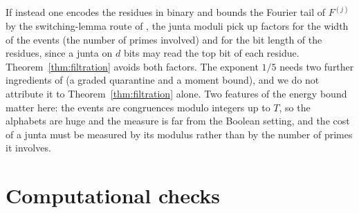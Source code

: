 \documentclass[11pt,reqno]{amsart}
\theoremstyle{definition}
\begin{document}
If instead one encodes the residues in binary and bounds the Fourier tail of
$F^{(j)}$ by the switching-lemma route of \cite{LMN}, the junta moduli pick up
factors for the width of the events (the number of primes involved) and for
the bit length of the residues, since a junta on $d$ bits may read the top bit of
each residue.  Theorem~\ref{thm:filtration} avoids both factors.  The
exponent $1/5$ needs two further ingredients of \cite{Subexp} (a graded
quarantine and a moment bound), and we do not attribute it to
Theorem~\ref{thm:filtration} alone.  Two features of the energy bound matter
here: the events are congruences modulo integers up to $T$, so the alphabets
are huge and the measure is far from the Boolean setting, and the cost of a
junta must be measured by its modulus rather than by the number of primes
it involves.

\section{Computational checks}\label{sec:check}
\end{document}
